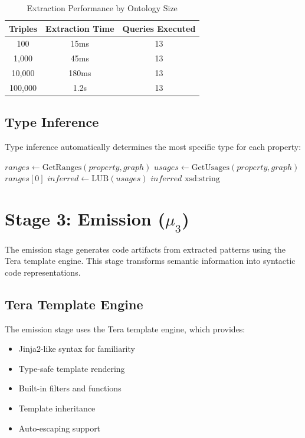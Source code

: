 \begin{table}[h]
\centering
\caption{Extraction Performance by Ontology Size}
\begin{tabular}{ccc}
\toprule
\textbf{Triples} & \textbf{Extraction Time} & \textbf{Queries Executed} \\
\midrule
100 & 15ms & 13 \\
1,000 & 45ms & 13 \\
10,000 & 180ms & 13 \\
100,000 & 1.2s & 13 \\
\bottomrule
\end{tabular}
\end{table}

\subsection{Type Inference}

Type inference automatically determines the most specific type for each property:

\begin{algorithm}
\caption{Type Inference Algorithm}
\begin{algorithmic}[1]
    \State $ranges \gets \text{GetRanges}(property, graph)$
    \State $usages \gets \text{GetUsages}(property, graph)$
        \State \Return $ranges[0]$ 
    \EndIf
        \State $inferred \gets \text{LUB}(usages)$ 
        \State \Return $inferred$
    \EndIf
    \State \Return $\text{xsd:string}$ 
\EndProcedure
\end{algorithmic}
\end{algorithm}

\section{Stage 3: Emission (\(\mu_3\))}

The emission stage generates code artifacts from extracted patterns using the Tera template engine. This stage transforms semantic information into syntactic code representations.

\subsection{Tera Template Engine}

The emission stage uses the Tera template engine, which provides:
\begin{itemize}
    \item Jinja2-like syntax for familiarity
    \item Type-safe template rendering
    \item Built-in filters and functions
    \item Template inheritance
    \item Auto-escaping support
\end{itemize}

